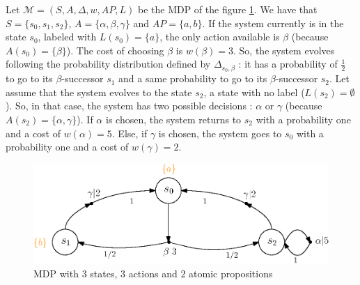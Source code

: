 \begin{example}\label{simple-mdp}
  Let $\mathcal{M} = (S, A, \Delta, w, AP, L)$ be the MDP of the figure \ref{mdp01}. We have that $S = \{s_0, s_1, s_2\}$, $A = \{\alpha, \beta, \gamma\}$ and $AP=\{a, b\}$. If the system currently is in the state $s_0$, labeled with $L(s_0) = \{a\}$, the only action available is $\beta$ (because $A(s_0) = \{\beta\}$).
  The cost of choosing $\beta$ is $w(\beta) = 3$.
  So, the system evolves following the probability distribution defined by $\Delta_{s_0, \beta}$ : it has a probability of $\frac{1}{2}$
  to go to its $\beta$-successor $s_1$ and a same probability to go to its $\beta$-successor $s_2$. Let assume that the system evolves to the state $s_2$, a state with no label ($L(s_2) = \emptyset$). So, in that case, the system has two possible decisions : $\alpha$ or $\gamma$ (because $A(s_2) = \{\alpha, \gamma\}$). If $\alpha$ is chosen, the system returns to $s_2$ with a probability one and a cost of $w(\alpha) = 5$. Else, if $\gamma$ is chosen, the system goes to $s_0$ with a probability one and a cost of $w(\gamma) = 2$.
  \begin{figure}[h!]
    \centering
    \includegraphics[width=0.7\linewidth]{resources/simple-mdp}
    \caption{MDP with $3$ states, $3$ actions and $2$ atomic propositions}\label{mdp01}
  \end{figure}
\end{example}

